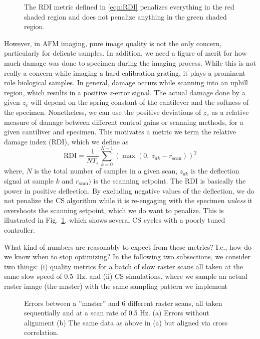 \documentclass[11pt]{article}
\begin{document}
\begin{figure}
  \centering
  
  \caption{The RDI metric defined in \eqref{eqn:RDI} penalizes everything in the red shaded region and does not penalize anything in the green shaded region.}
  \label{fig:damage_illustrate}
\end{figure}
However, in AFM imaging, pure image quality is not the only concern, particularly for delicate samples. In addition, we need a figure of merit for how much damage was done to specimen during the imaging process. While this is not really a concern while imaging a hard calibration grating, it plays a prominent role biological samples. In general, damage occurs while scanning into an uphill region, which results in a positive $z$-error signal. The actual damage done by a given $z_e$ will depend on the spring constant of the cantilever and the softness of the specimen. Nonetheless, we can use the positive deviations of $z_e$ as a relative measure of damage between different control gains or scanning methods, for a given cantiliver and specimen. This motivates a metric we term the relative damage index (RDI), which we define as 
\begin{equation}
  \text{RDI} = \frac{1}{NT_s}\sum_{k=0}^{N-1} \left(\max(0,~z_{dk}-r_{\textrm{scan}})\right)^2 \label{eqn:RDI}
\end{equation}
where, $N$ is the total number of samples in a given scan, $z_{dk}$ is the deflection signal at sample $k$ and $r_{\textrm{scan}})$ is the scanning setpoint. 
The RDI is basically the power in positive deflection.
By excluding negative values of the deflection, we do not penalize the CS algorithm while it is re-engaging with the specimen \emph{unless} it overshoots the scanning setpoint, which we do want to penalize. This is illustrated in Fig.~\ref{fig:damage_illustrate}, which shows several CS cycles with a poorly tuned controller.

What kind of numbers are reasonably to expect from these metrics? I.e., how do we know when to stop optimizing? In the following two subsections,  we consider two things: (i) quality metrics for a batch of slow raster scans all taken at the same slow speed of 0.5~Hz. and (ii) CS simulations, where we sample an actual raster image (the master) with the same sampling pattern we implement 

\begin{figure}
  \begin{subfigure}{.48\textwidth}
    
    \caption{}
    \label{fig:rast_unaligned}
  \end{subfigure}
  \begin{subfigure}{.48\textwidth}
    
      \caption{}
    \label{fig:baseline_errors_aligned}
  \end{subfigure}
  \caption{Errors between a ''master'' and 6 different raster scans, all taken sequentially and at a scan rate of 0.5 Hz. (a) Errors without alignment (b) The same data as above in (a) but aligned via cross correlation.}
  \label{fig:baseline_errors}
\end{figure}
\end{document}
